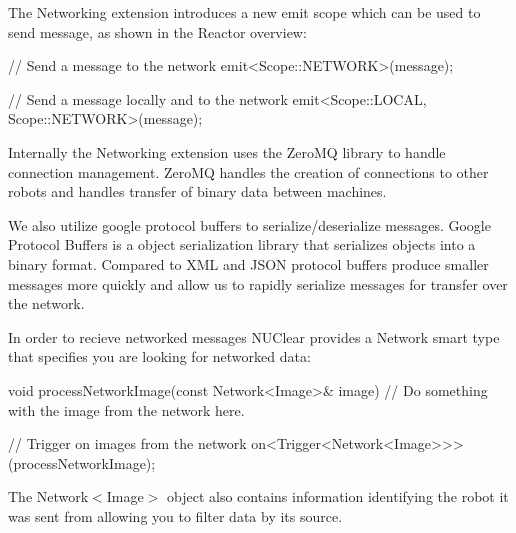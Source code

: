 \documentclass[english,12pt]{scrartcl}
\begin{document}
				The Networking extension introduces a new emit scope which can be used to send message, as shown in the Reactor overview:
				
				\begin{cppcode}
					// Send a message to the network
					emit<Scope::NETWORK>(message);
					
					// Send a message locally and to the network
					emit<Scope::LOCAL, Scope::NETWORK>(message);
				\end{cppcode}
				
				Internally the Networking extension uses the ZeroMQ library to handle connection management.
				ZeroMQ handles the creation of connections to other robots and handles transfer of binary data between machines.
				
				We also utilize google protocol buffers to serialize/deserialize messages. 
				Google Protocol Buffers is a object serialization library that serializes objects into a binary format.
				Compared to XML and JSON protocol buffers produce smaller messages more quickly and allow us to rapidly serialize messages for transfer over the network.
				
				In order to recieve networked messages NUClear provides a Network smart type that specifies you are looking for networked data:
				
				\begin{cppcode}
					void processNetworkImage(const Network<Image>& image) {
					    // Do something with the image from the network here.
					}
					
					// Trigger on images from the network
					on<Trigger<Network<Image>>>(processNetworkImage);
				\end{cppcode}
				
				The Network$<$Image$>$ object also contains information identifying the robot it was sent from allowing you to filter data by its source.
				
\end{document}
